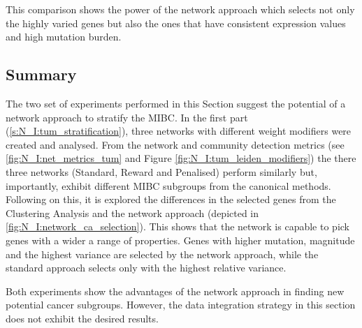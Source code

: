 This comparison shows the power of the network approach which selects not only the highly varied genes but also the ones that have consistent expression values and high mutation burden.

\subsection{Summary}

The two set of experiments performed in this Section suggest the potential of a network approach to stratify the MIBC. In the first part (\cref{s:N_I:tum_stratification}), three networks with different weight modifiers were created and analysed. From the network and community detection metrics (see \cref{fig:N_I:net_metrics_tum} and Figure \cref{fig:N_I:tum_leiden_modifiers}) the there three networks (Standard, Reward and Penalised) perform similarly but, importantly, exhibit different MIBC subgroups from the canonical methods. Following on this, it is explored the differences in the selected genes from the Clustering Analysis and the network approach (depicted in \cref{fig:N_I:network_ca_selection}). This shows that the network is capable to pick genes with a wider a range of properties. Genes with higher mutation, magnitude and the highest variance are selected by the network approach, while the standard approach selects only with the highest relative variance.

Both experiments show the advantages of the network approach in finding new potential cancer subgroups. However, the data integration strategy in this section does not exhibit the desired results.


